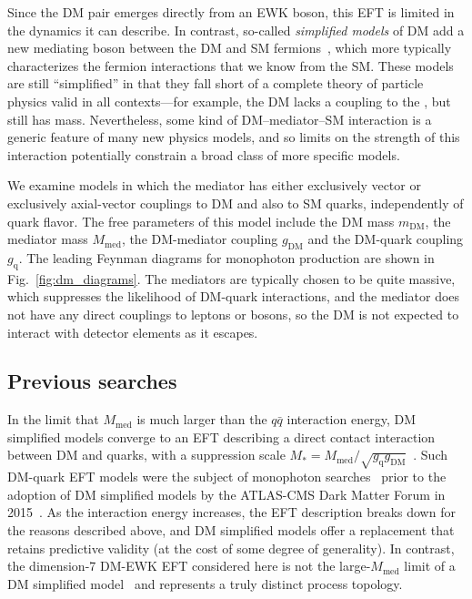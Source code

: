 \documentclass[oneside, letterpaper, 12pt, oldfontcommands]{memoir}
\begin{document}
Since the DM pair emerges directly from an EWK boson, this EFT is limited in the dynamics it can describe. In contrast, so-called \textit{simplified models} of DM add
a new mediating boson between the DM and SM fermions~\cite{ref:1507.00966}, which more typically characterizes the fermion interactions that we know
from the SM. These models are still ``simplified'' in that they fall short of a complete theory of particle physics valid in all contexts---for example,
the DM lacks a coupling to the \PH, but still has mass. Nevertheless, some kind of DM--mediator--SM interaction is a generic feature of many new physics models,
and so limits on the strength of this interaction potentially constrain a broad class of more specific models.

We examine models in which the mediator has either exclusively vector or exclusively axial-vector couplings to DM and also to SM quarks, independently
of quark flavor. The free parameters of this model include
the DM mass $m_\mathrm{DM}$, the mediator mass $M_\mathrm{med}$, the DM-mediator coupling $g_\mathrm{DM}$ and the DM-quark coupling $g_\mathrm{q}$.
The leading Feynman diagrams for monophoton production are shown in Fig.~\ref{fig:dm_diagrams}. The mediators are typically chosen to be quite massive,
which suppresses the likelihood of DM-quark interactions, and the mediator does not have any direct couplings to leptons or bosons,
so the DM is not expected to interact with detector elements as it escapes.

\subsection{Previous searches} \label{sec:introduction_dm_previous_searches}
In the limit that $M_\mathrm{med}$ is much larger than the $q\bar{q}$ interaction energy, DM simplified models converge to an EFT describing a direct contact
interaction between DM and quarks, with a suppression scale $M_\mathrm{*} = M_\mathrm{med}/\sqrt{g_\mathrm{q}g_\mathrm{DM}}$~\cite{ref:1603.04156}.
Such DM-quark EFT models were the subject of monophoton searches~\cite{ref:j.physletb.2016.01.057, ref:PhysRevD.91.012008} prior to the adoption of
DM simplified models by the ATLAS-CMS Dark Matter Forum in 2015~\cite{ref:1507.00966}.
As the interaction energy increases, the EFT description breaks down for the reasons described above, and DM simplified models
offer a replacement that retains predictive validity (at the cost of some degree of generality).
In contrast, the dimension-7 DM-EWK EFT considered here is not the large-$M_\mathrm{med}$ limit of a DM simplified model~\cite{ref:1507.00966} and represents a truly distinct
process topology.
\end{document}
